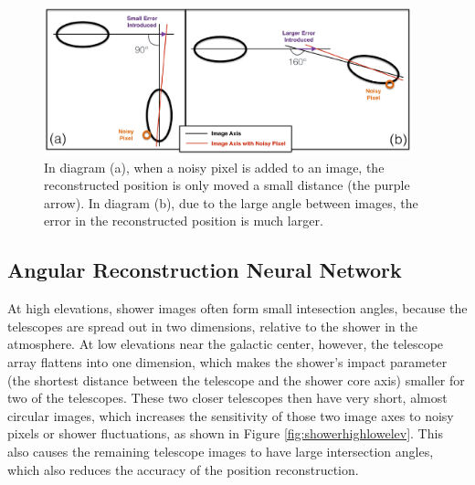   \begin{figure}[ht]
    \centering
    \includegraphics[width=0.95\textwidth]{images/large_angle_image_intersection_error_cropped.eps}
    \caption[Large Image Intersection Angles]{
      In diagram (a), when a noisy pixel is added to an image, the reconstructed position is only moved a small distance (the purple arrow).
      In diagram (b), due to the large angle between images, the error in the reconstructed position is much larger.
    }
    \label{fig:largeintersectangle}
  \end{figure}

  \subsection{Angular Reconstruction Neural Network}\label{subsec:disp}
    At high elevations, shower images often form small intesection angles, because the telescopes are spread out in two dimensions, relative to the shower in the atmosphere.
    At low elevations near the galactic center, however, the telescope array flattens into one dimension, which makes the shower's impact parameter (the shortest distance between the telescope and the shower core axis) smaller for two of the telescopes.
    These two closer telescopes then have very short, almost circular images, which increases the sensitivity of those two image axes to noisy pixels or shower fluctuations, as shown in Figure \ref{fig:showerhighlowelev}.
    This also causes the remaining telescope images to have large intersection angles, which also reduces the accuracy of the position reconstruction.

